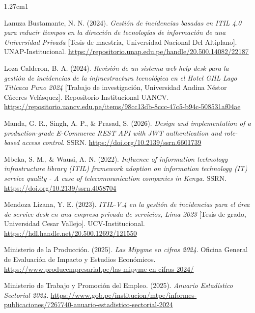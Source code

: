 \begin{hangparas}{1.27cm}{1}
\vspace{0.8em}

Lanuza Bustamante, N. N. (2024). \textit{Gestión de incidencias basadas en ITIL 4.0 para reducir tiempos en la dirección de tecnologías de información de una Universidad Privada} [Tesis de maestría, Universidad Nacional Del Altiplano]. UNAP-Institucional. \url{https://repositorio.unap.edu.pe/handle/20.500.14082/22187}

\vspace{0.8em}

Loza Calderon, B. A. (2024). \textit{Revisión de un sistema web help desk para la gestión de incidencias de la infraestructura tecnológica en el Hotel GHL Lago Titicaca Puno 2024} [Trabajo de investigación, Universidad Andina Néstor Cáceres Velásquez]. Repositorio Institucional UANCV. \url{https://repositorio.uancv.edu.pe/items/98cc13db-8ccc-47c5-b94c-508531af04ae}

\vspace{0.8em}

Manda, G. R., Singh, A. P., \& Prasad, S. (2026). \textit{Design and implementation of a production-grade E-Commerce REST API with JWT authentication and role-based access control}. SSRN. \url{https://doi.org/10.2139/ssrn.6601739}

\vspace{0.8em}

Mbeka, S. M., \& Wausi, A. N. (2022). \textit{Influence of information technology infrastructure library (ITIL) framework adoption on information technology (IT) service quality - A case of telecommunication companies in Kenya}. SSRN. \url{https://doi.org/10.2139/ssrn.4058704}

\vspace{0.8em}

Mendoza Lizana, Y. E. (2023). \textit{ITIL-V.4 en la gestión de incidencias para el área de service desk en una empresa privada de servicios, Lima 2023} [Tesis de grado, Universidad Cesar Vallejo]. UCV-Institucional. \url{https://hdl.handle.net/20.500.12692/121550}
\vspace{0.8em}

Ministerio de la Producción. (2025). \textit{Las Mipyme en cifras 2024}. Oficina General de Evaluación de Impacto y Estudios Económicos. \url{https://www.producempresarial.pe/las-mipyme-en-cifras-2024/}

\vspace{0.8em}

Ministerio de Trabajo y Promoción del Empleo. (2025). \textit{Anuario Estadístico Sectorial 2024}. \url{https://www.gob.pe/institucion/mtpe/informes-publicaciones/7267740-anuario-estadistico-sectorial-2024}


\end{hangparas}
